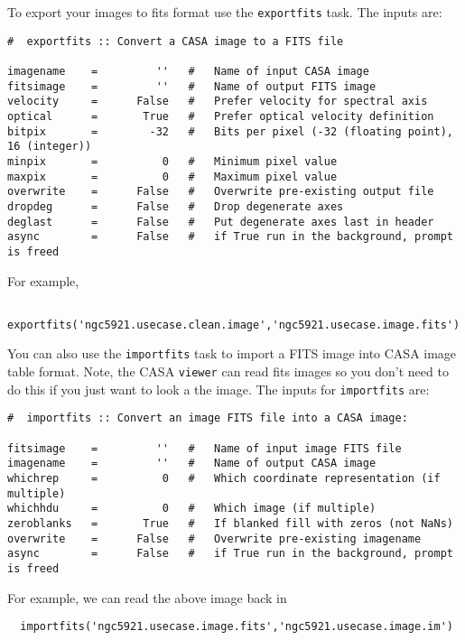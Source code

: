 To export your images to fits format use the {\tt exportfits} task.
The inputs are:
\small
\begin{verbatim}
#  exportfits :: Convert a CASA image to a FITS file

imagename    =         ''   #   Name of input CASA image
fitsimage    =         ''   #   Name of output FITS image
velocity     =      False   #   Prefer velocity for spectral axis
optical      =       True   #   Prefer optical velocity definition
bitpix       =        -32   #   Bits per pixel (-32 (floating point), 16 (integer))
minpix       =          0   #   Minimum pixel value
maxpix       =          0   #   Maximum pixel value
overwrite    =      False   #   Overwrite pre-existing output file
dropdeg      =      False   #   Drop degenerate axes
deglast      =      False   #   Put degenerate axes last in header
async        =      False   #   if True run in the background, prompt is freed

\end{verbatim}
\normalsize
For example,
\small
\begin{verbatim}
   exportfits('ngc5921.usecase.clean.image','ngc5921.usecase.image.fits')
\end{verbatim}
\normalsize

You can also use the {\tt importfits} task to import a FITS image into
CASA image table format.  Note, the CASA {\tt viewer} can read fits
images so you don't need to do this if you just want to look a the image.  
The inputs for {\tt importfits} are:
\small
\begin{verbatim}
#  importfits :: Convert an image FITS file into a CASA image:

fitsimage    =         ''   #   Name of input image FITS file
imagename    =         ''   #   Name of output CASA image
whichrep     =          0   #   Which coordinate representation (if multiple)
whichhdu     =          0   #   Which image (if multiple)
zeroblanks   =       True   #   If blanked fill with zeros (not NaNs)
overwrite    =      False   #   Overwrite pre-existing imagename
async        =      False   #   if True run in the background, prompt is freed
\end{verbatim}
\normalsize
For example, we can read the above image back in
\small
\begin{verbatim}
  importfits('ngc5921.usecase.image.fits','ngc5921.usecase.image.im')
\end{verbatim}
\normalsize

